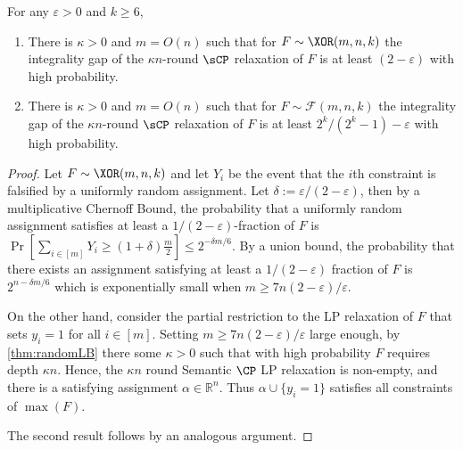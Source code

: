 \begin{theorem}
	For any $\varepsilon >0$ and $k \geq 6$,
	\begin{enumerate}
		\item[$1$.] There is $\kappa>0$ and $m = O(n)$ such that for $F \sim \XOR(m,n,k)$ the integrality gap of the $\kappa n$-round  $\sCP$ relaxation of $F$ is at least $(2-\varepsilon)$ with high probability. 
		\item[$2$.] There is $\kappa >0$ and $m=O(n)$ such that for $F \sim \mathcal{F}(m,n,k)$ the integrality gap of the $\kappa n$-round $\sCP$ relaxation of $F$ is at least $2^k/(2^k-1) - \varepsilon$ with high probability.
	\end{enumerate}
\end{theorem}
\begin{proof}
	Let $F \sim \XOR(m,n,k)$ and let $Y_i$ be the event that the $i$th constraint is falsified by a uniformly random assignment. Let $\delta:=\varepsilon/(2-\varepsilon)$, then by a multiplicative Chernoff Bound, the probability that a uniformly random assignment satisfies at least a $1/(2-\varepsilon)$-fraction of $F$ is 
	$ \Pr [\sum_{i \in [m]}Y_i \geq (1+\delta)\frac{m}{2} ] \leq 2^{-\delta m/6}$.
	By a union bound, the probability that there exists an assignment satisfying at least a $1/(2-\varepsilon)$ fraction of $F$ is $2^{n-\delta m/6}$ which is exponentially small when $m \geq 7n(2-\varepsilon)/\varepsilon$.
	
	On the other hand, consider the partial restriction to the LP relaxation of $F$ that sets $y_i=1$ for all $i \in [m]$.
	Setting $m \geq 7n(2-\varepsilon)/\varepsilon$ large enough, by \autoref{thm:randomLB} there some $\kappa > 0$ such that with high probability $F$ requires depth $\kappa n$. 
	Hence, the $\kappa n$ round Semantic $\CP$ LP relaxation is non-empty, and there is a satisfying assignment $\alpha \in \mathbb{R}^n$. Thus $\alpha \cup \{y_i=1\}$ satisfies all constraints of $\max(F)$.
	
	The second result follows by an analogous argument.
\end{proof}




%


%



